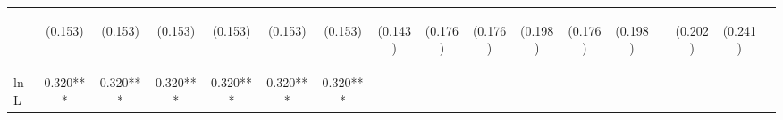 \begin{center}
\begin{tabular}{lcccccccccccccccc}
\vspace{4pt} & \begin{footnotesize}(0.153)\end{footnotesize} & \begin{footnotesize}(0.153)\end{footnotesize} & \begin{footnotesize}(0.153)\end{footnotesize} & \begin{footnotesize}(0.153)\end{footnotesize} & \begin{footnotesize}(0.153)\end{footnotesize} & \begin{footnotesize}(0.153)\end{footnotesize} & \begin{footnotesize}(0.143)\end{footnotesize} & \begin{footnotesize}(0.176)\end{footnotesize} & \begin{footnotesize}(0.176)\end{footnotesize} & \begin{footnotesize}(0.198)\end{footnotesize} & \begin{footnotesize}(0.176)\end{footnotesize} & \begin{footnotesize}(0.198)\end{footnotesize} & \begin{footnotesize}\end{footnotesize} & \begin{footnotesize}(0.202)\end{footnotesize} & \begin{footnotesize}(0.241)\end{footnotesize} & \begin{footnotesize}\end{footnotesize} \\
lnL & 0.320*** & 0.320*** & 0.320*** & 0.320*** & 0.320*** & 0.320*** &  &  &  &  &  &  &  &  &  &  \\

\end{tabular}
\end{center}
